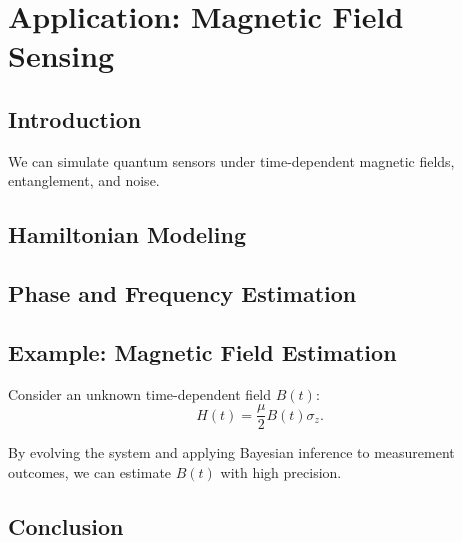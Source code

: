 \chapter{Application: Magnetic Field Sensing}
\section{Introduction}
We can simulate quantum sensors under time-dependent magnetic fields, entanglement, and noise.
\section{Hamiltonian Modeling}
\section{Phase and Frequency Estimation}
\section{Example: Magnetic Field Estimation}

Consider an unknown time-dependent field $B(t)$:
\[
H(t) = \frac{\mu}{2} B(t) \sigma_z.
\]

By evolving the system and applying Bayesian inference to measurement
outcomes, we can estimate $B(t)$ with high precision.

\section{Conclusion}
